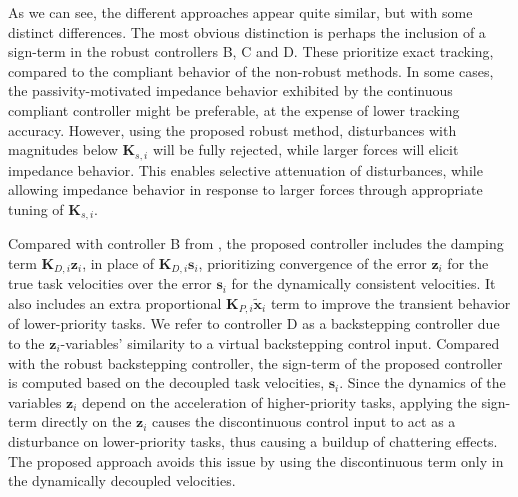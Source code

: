 \documentclass[../main.tex]{subfiles}
\begin{document}
As we can see, the different approaches appear quite similar, but with some distinct differences. The most obvious distinction is perhaps the inclusion of a sign-term in the robust controllers B, C and D. These prioritize exact tracking, compared to the compliant behavior of the non-robust methods. In some cases, the passivity-motivated impedance behavior exhibited by the continuous compliant controller might be preferable, at the expense of lower tracking accuracy. However, using the proposed robust method, disturbances with magnitudes below $\bm{K}_{s,i}$ will be fully rejected, while larger forces will elicit impedance behavior. This enables selective attenuation of disturbances, while allowing impedance behavior in response to larger forces through appropriate tuning of $\bm{K}_{s,i}$.


Compared with controller B from \cite{DyrhaugTveter2023}, the proposed controller includes the damping term $\bm{K}_{D,i} \bm{z}_i$, in place of $\bm{K}_{D,i} \bm{s}_i$, prioritizing convergence of the error $\bm{z}_i$ for the true task velocities over the error $\bm{s}_i$ for the dynamically consistent velocities. It also includes an extra proportional $\bm{K}_{P,i} \tilde{\bm{x}}_i$ term to improve the transient behavior of lower-priority tasks. We refer to controller D as a backstepping controller due to the $\bm{z}_i$-variables' similarity to a virtual backstepping control input. Compared with the robust backstepping controller, the sign-term of the proposed controller is computed based on the decoupled task velocities, $\bm{s}_i$. Since the dynamics of the variables $\bm{z}_i$ depend on the acceleration of higher-priority tasks, applying the sign-term directly on the $\bm{z}_i$ causes the discontinuous control input to act as a disturbance on lower-priority tasks, thus causing a buildup of chattering effects. The proposed approach avoids this issue by using the discontinuous term only in the dynamically decoupled velocities.

\end{document}
